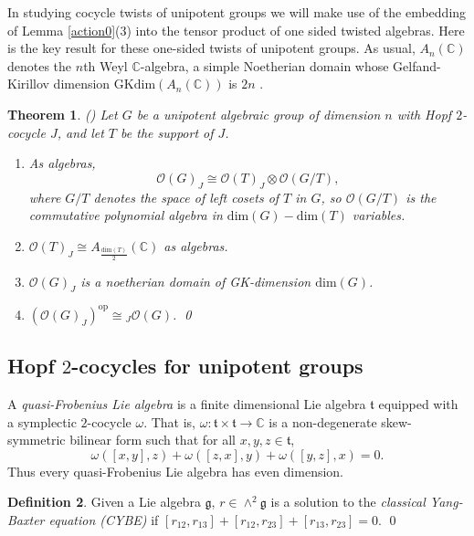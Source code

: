\documentclass{amsart}
\numberwithin{equation}{section}
\newtheorem{theorem}{Theorem}[section]
\theoremstyle{definition}
\newtheorem{definition}[theorem]{Definition}
\begin{document}
In studying cocycle twists of unipotent groups we will make use of the embedding of Lemma \ref{action0}(3) into the  tensor product of one sided twisted algebras. Here is the key result for these one-sided twists of unipotent groups. As usual, $A_n(\mathbb{C})$ denotes the $n$th Weyl $\mathbb{C}$-algebra, a simple Noetherian domain whose Gelfand-Kirillov dimension $\mathrm{GKdim}(A_n(\mathbb{C}))$ is $2n$ \cite[Proposition 8.1.15(2)]{McCR}.

\begin{theorem}\label{Weyl} {\rm (\cite[Theorem 4.7]{G1})} Let $G$ be a unipotent algebraic group of dimension $n$ with Hopf $2$-cocycle $J$, and let $T$ be the support of $J$.
\begin{enumerate}
\item As algebras,
$$ \mathcal{O}(G)_J\cong\mathcal{O}(T)_J \otimes \mathcal{O}(G/T),$$
where $G/T$ denotes the space of left cosets of $T$ in $G$, so $\mathcal{O}(G/T)$ is the commutative polynomial algebra in $\mathrm{dim}(G) - \mathrm{dim}(T)$ variables.
\item $\mathcal{O}(T)_J\cong A_{\frac{\mathrm{dim}(T)}{2}}(\mathbb{C})$ as algebras.
\item $\mathcal{O}(G)_J$ is a noetherian domain of GK-dimension $\mathrm{dim}(G)$.
\item $(\mathcal{O}(G)_J)^{\mathrm{op}} \cong {}_J\mathcal{O}(G)$. \qed
\end{enumerate}
\end{theorem}

\subsection{Hopf $2$-cocycles for unipotent groups}\label{2cocycunip}  
A \emph{quasi-Frobenius Lie algebra} is a finite dimensional Lie algebra $\mathfrak{t}$ equipped with a symplectic $2$-cocycle $\omega$. That is, $\omega:\mathfrak{t} \times \mathfrak{t}\to \mathbb{C}$ is a non-degenerate skew-symmetric bilinear form such that for all $x,y,z \in \mathfrak{t}$,
\begin{equation}\label{cycle} \omega([x,y],z) + \omega([z,x],y) + \omega([y,z],x) = 0.
\end{equation} 
Thus every quasi-Frobenius Lie algebra has even dimension.

\begin{definition}\label{CYBE} Given a Lie algebra $\mathfrak{g}$, $r \in \wedge^2\mathfrak{g}$ is a solution to the \emph{classical Yang-Baxter equation (CYBE)} if
$[r_{12},r_{13}] +[r_{12},r_{23}] + [r_{13},r_{23}]=0$. \qed
\end{definition}
\end{document}
